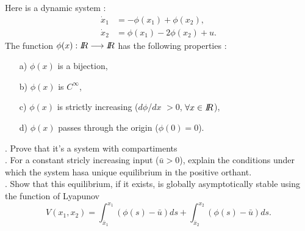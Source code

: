 \begin{exercice}
Here is a dynamic system :
\begin{align*}
\dot x_1 &= - \phi(x_1) + \phi(x_2), \\
\dot x_2 &= \phi(x_1) - 2 \phi(x_2) + u.
\end{align*}
The function $\phi(x) : I \! \! R \longrightarrow I \! \! R$ has the following properties :\\
\begin{itemize}
\item[a)] $\phi(x)$ is a bijection,\\
\item[b)] $\phi(x)$ is $C^\infty$,\\
\item[c)] $\phi(x)$ is strictly increasing ($d\phi$/$dx$ $> 0$, $\forall x \in I \! \! R$),\\
\item[d)] $\phi(x)$ passes through the origin ($\phi(0) = 0$).
\end{itemize}
\vspace{8mm}
. Prove that it's a system with compartiments \\

. For a constant stricly increasing input ($\bar u > 0$), explain the conditions under which the system hasa unique equilibrium in the positive orthant.\\

. Show that this equilibrium, if it exists, is globally asymptotically stable using the function of Lyapunov
\begin{equation*}
V(x_1,x_2) = \int_{\bar x_1}^{x_1} (\phi(s) - \bar u) ds + \int_{\bar x_2}^{x_2} (\phi(s) - \bar u) ds.
\end{equation*}

\end{exercice}



